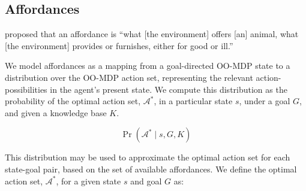 \documentclass[conference]{IEEEtran}
\begin{document}



\subsection{Affordances}

\citet{gibson77} proposed that an affordance is ``what [the
  environment] offers [an] animal, what [the environment] provides or
furnishes, either for good or ill.''  

We model affordances as a mapping from a goal-directed OO-MDP state to
a distribution over the OO-MDP action set, representing the relevant action-possibilities
in the agent's present state. We compute this distribution as the probability of the optimal
action set, $\mathcal{A}^*$, in a particular state $s$, under a goal $G$, and given a knowledge base $K$.

\begin{equation}
\Pr(\mathcal{A}^* \mid s, G, K)
\label{eq:master}
\end{equation}

This distribution may be used to approximate the optimal action set for each 
state-goal pair, based on the set of available affordances. We define the optimal
action set, $\mathcal{A}^*$, for a given state $s$ and goal $G$ as:
\end{document}
